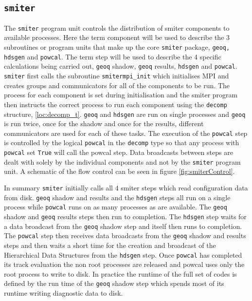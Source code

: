 \subsection{\tt smiter}
\label{loc:smiter}
The {\tt smiter} program unit controls the distribution of smiter components to available processes. Here the term component will be used to describe the 3 subroutines or program units that make up the core {\tt smiter} package, {\tt geoq, hdsgen} and {\tt powcal}. The term step will be used to describe the 4 specific calculations being carried out, {\tt geoq} shadow, {\tt geoq} results, {\tt hdsgen} and {\tt powcal}. {\tt smiter} first calls the subroutine {\tt smitermpi\_init} which initialises MPI and creates groups and communicators for all of the components to be run. The process for each component is set during initialisation and the smiter program then instructs the correct process to run each component using the {\tt decomp} structure, \ref{loc:decomp_t}. {\tt geoq} and {\tt hdsgen} are run on single processes and {\tt geoq} is run twice, once for the shadow and once for the results, different communicators are used for each of these tasks. The execution of the {\tt powcal} step is controlled by the logical {\tt powcal} in the {\tt decomp} type so that any process with {\tt powcal} set {\tt True} will call the powcal step. Data broadcasts between steps are dealt with solely by the individual components and not by the {\tt smiter} program unit. A schematic of the flow control can be seen in figure \ref{fig:smiterControl}.

In summary {\tt smiter} initially calls all 4 smiter steps which read configuration data from disk. {\tt geoq} shadow and results and the {\tt hdsgen} steps all run on a single process while {\tt powcal} runs on as many processes as are available. The {\tt geoq} shadow and {\tt geoq} results steps then run to completion. The {\tt hdsgen} step waits for a data broadcast from the {\tt geoq} shadow step and itself then runs to completion. The {\tt powcal} step then receives data broadcasts from the {\tt geoq} shadow and results steps and then waits a short time for the creation and broadcast of the Hierarchical Data Structures from the {\tt hdsgen} step. Once {\tt powcal} has completed its track evaluation the non root processes are released and powcal uses only the root process to write to disk. In practice the runtime of the full set of codes is defined by the run time of the {\tt geoq} shadow step which spends most of its runtime writing diagnostic data to disk.


